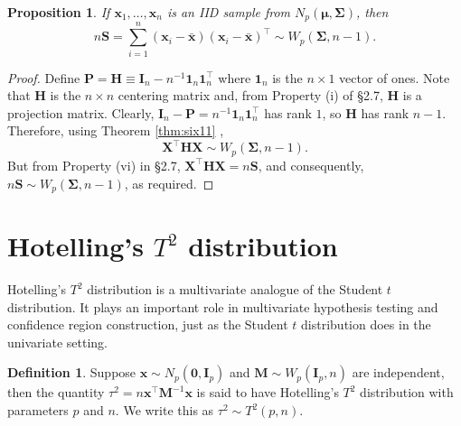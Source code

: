 \documentclass[]{book}
\newtheorem{proposition}{Proposition}[chapter]
\theoremstyle{definition}
\newtheorem{definition}{Definition}[chapter]
\theoremstyle{definition}
\theoremstyle{definition}
\theoremstyle{remark}
\begin{document}
\begin{proposition}
\protect\hypertarget{prp:six12}{}{\label{prp:six12} }If \(\boldsymbol x_1,\ldots,\boldsymbol x_n\) is an IID sample from \(N_p(\boldsymbol \mu,\boldsymbol \Sigma)\), then
\[ n \boldsymbol S= \sum_{i=1}^n (\boldsymbol x_i - \bar{\boldsymbol x})(\boldsymbol x_i - \bar{\boldsymbol x})^\top \sim W_p(\boldsymbol \Sigma,n-1).\]
\end{proposition}

\begin{proof}
{} Define \(\boldsymbol P= {\mathbf H}\equiv \boldsymbol I_n - n^{-1}{\mathbf 1}_n {\mathbf 1}_n^\top\) where \({\mathbf 1}_n\) is the \(n \times 1\) vector of ones. Note that \(\boldsymbol H\) is the \(n \times n\) centering matrix and, from Property (i) of \S 2.7, \(\boldsymbol H\) is a projection matrix. Clearly, \(\boldsymbol I_n - \boldsymbol P=n^{-1} {\mathbf 1}_n {\mathbf 1}_n^\top\) has rank \(1\), so \(\boldsymbol H\) has rank \(n-1\). Therefore, using Theorem \ref{thm:six11} ,
\[
\boldsymbol X^\top \boldsymbol H\boldsymbol X\sim W_p(\boldsymbol \Sigma, n-1).
\]
But from Property (vi) in \S 2.7, \(\boldsymbol X^\top \boldsymbol H\boldsymbol X=n\boldsymbol S\),
and consequently, \(n\boldsymbol S\sim W_p(\boldsymbol \Sigma, n-1)\), as required.
\end{proof}

\hypertarget{hotellings-t2-distribution}{%
\section{\texorpdfstring{Hotelling's \(T^2\) distribution}{Hotelling's T\^{}2 distribution}}\label{hotellings-t2-distribution}}

Hotelling's \(T^2\) distribution is a multivariate analogue of the Student \(t\) distribution. It plays an important role in multivariate hypothesis testing and confidence region construction, just as the Student \(t\) distribution does in the univariate setting.

\begin{definition}
\protect\hypertarget{def:Hotelling}{}{\label{def:Hotelling} }Suppose \(\boldsymbol x\sim N_p(\boldsymbol 0,\boldsymbol I_p)\) and \(\boldsymbol M\sim W_p(\boldsymbol I_p,n)\) are independent, then the quantity \(\tau ^2 = n \boldsymbol x^\top \boldsymbol M^{-1} \boldsymbol x\) is said to have Hotelling's \(T^2\) distribution with parameters \(p\) and \(n\). We write this as \(\tau^2 \sim T^2(p,n)\).
\end{definition}
\end{document}
